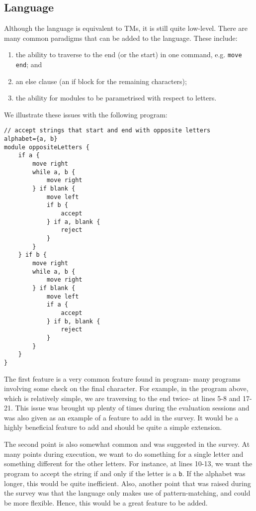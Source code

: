 \subsection{Language}
Although the language is equivalent to TMs, it is still quite low-level. There are many common paradigms that can be added to the language. These include:
\begin{enumerate}
    \item the ability to traverse to the end (or the start) in one command, e.g. \texttt{move end}; and
    \item an else clause (an if block for the remaining characters); 
    \item the ability for modules to be parametrised with respect to letters.
\end{enumerate}
We illustrate these issues with the following program:
\begin{lstlisting}[language=TML]
// accept strings that start and end with opposite letters
alphabet={a, b}
module oppositeLetters {
    if a {
        move right
        while a, b {
            move right
        } if blank {
            move left
            if b {
                accept
            } if a, blank {
                reject
            }
        }
    } if b {
        move right
        while a, b {
            move right
        } if blank {
            move left
            if a {
                accept
            } if b, blank {
                reject
            }
        }
    }
}
\end{lstlisting}

The first feature is a very common feature found in program- many programs involving some check on the final character. For example, in the program above, which is relatively simple, we are traversing to the end twice- at lines 5-8 and 17-21. This issue was brought up plenty of times during the evaluation sessions and was also given as an example of a feature to add in the survey. It would be a highly beneficial feature to add and should be quite a simple extension.

The second point is also somewhat common and was suggested in the survey. At many points during execution, we want to do something for a single letter and something different for the other letters. For instance, at lines 10-13, we want the program to accept the string if and only if the letter is a \texttt{b}. If the alphabet was longer, this would be quite inefficient. Also, another point that was raised during the survey was that the language only makes use of pattern-matching, and could be more flexible. Hence, this would be a great feature to be added. 

